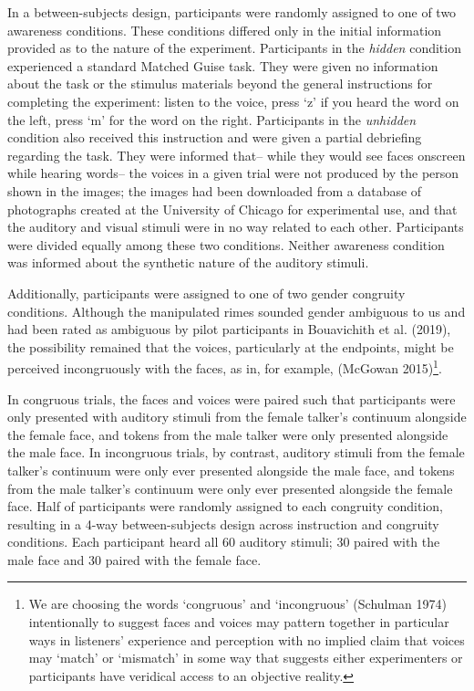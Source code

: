 \documentclass[
  letterpaper,
  DIV=11,
  numbers=noendperiod]{scrartcl}
\begin{document}
In a between-subjects design, participants were randomly assigned to one
of two awareness conditions. These conditions differed only in the
initial information provided as to the nature of the experiment.
Participants in the \emph{hidden} condition experienced a standard
Matched Guise task. They were given no information about the task or the
stimulus materials beyond the general instructions for completing the
experiment: listen to the voice, press `z' if you heard the word on the
left, press `m' for the word on the right. Participants in the
\emph{unhidden} condition also received this instruction and were given
a partial debriefing regarding the task. They were informed that-- while
they would see faces onscreen while hearing words-- the voices in a
given trial were not produced by the person shown in the images; the
images had been downloaded from a database of photographs created at the
University of Chicago for experimental use, and that the auditory and
visual stimuli were in no way related to each other. Participants were
divided equally among these two conditions. Neither awareness condition
was informed about the synthetic nature of the auditory stimuli.

Additionally, participants were assigned to one of two gender congruity
conditions. Although the manipulated rimes sounded gender ambiguous to
us and had been rated as ambiguous by pilot participants in Bouavichith
et al. (2019), the possibility remained that the voices, particularly at
the endpoints, might be perceived incongruously with the faces, as in,
for example, (McGowan 2015)\footnote{We are choosing the words
  `congruous' and `incongruous' (Schulman 1974) intentionally to suggest
  faces and voices may pattern together in particular ways in listeners'
  experience and perception with no implied claim that voices may
  `match' or `mismatch' in some way that suggests either experimenters
  or participants have veridical access to an objective reality.}.

In congruous trials, the faces and voices were paired such that
participants were only presented with auditory stimuli from the female
talker's continuum alongside the female face, and tokens from the male
talker were only presented alongside the male face. In incongruous
trials, by contrast, auditory stimuli from the female talker's continuum
were only ever presented alongside the male face, and tokens from the
male talker's continuum were only ever presented alongside the female
face. Half of participants were randomly assigned to each congruity
condition, resulting in a 4-way between-subjects design across
instruction and congruity conditions. Each participant heard all 60
auditory stimuli; 30 paired with the male face and 30 paired with the
female face.
\end{document}
